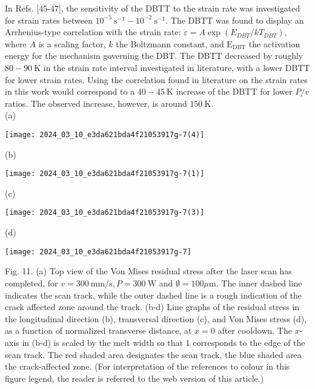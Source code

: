 \documentclass[10pt]{article}
\begin{document}
In Refs. [45-47], the sensitivity of the DBTT to the strain rate was investigated for strain rates between $10^{-5} \mathrm{~s}^{-1}-10^{-2} \mathrm{~s}^{-1}$. The DBTT was found to display an Arrhenius-type correlation with the strain rate: $\dot{\varepsilon}=A \exp \left(E_{D B T} / k T_{D B T}\right)$, where $A$ is a scaling factor, $k$ the Boltzmann constant, and $\mathrm{E}_{\mathrm{DBT}}$ the activation energy for the mechanism governing the DBT. The DBTT decreased by roughly $80-90 \mathrm{~K}$ in the strain rate interval investigated in literature, with a lower DBTT for lower strain rates. Using the correlation found in literature on the strain rates in this work would correspond to a $40-45 \mathrm{~K}$ increase of the DBTT for lower $P / v$ ratios. The observed increase, however, is around $150 \mathrm{~K}$.\\
(a)

\begin{center}
\texttt{[image: 2024\_03\_10\_e3da621bda4f21053917g-7(4)]}
\end{center}

(b)

\begin{center}
\texttt{[image: 2024\_03\_10\_e3da621bda4f21053917g-7(1)]}
\end{center}

(c)

\begin{center}
\texttt{[image: 2024\_03\_10\_e3da621bda4f21053917g-7(3)]}
\end{center}

(d)

\begin{center}
\texttt{[image: 2024\_03\_10\_e3da621bda4f21053917g-7]}
\end{center}

Fig. 11. (a) Top view of the Von Mises residual stress after the laser scan has completed, for $v=300 \mathrm{~mm} / \mathrm{s}, P=300 \mathrm{~W}$ and $\emptyset=100 \mu \mathrm{m}$. The inner dashed line indicates the scan track, while the outer dashed line is a rough indication of the crack affected zone around the track. (b-d) Line graphs of the residual stress in the longitudinal direction (b), transversal direction (c), and Von Mises stress (d), as a function of normalized transverse distance, at $x=0$ after cooldown. The $x$-axis in (b-d) is scaled by the melt width so that 1 corresponds to the edge of the scan track. The red shaded area designates the scan track, the blue shaded area the crack-affected zone. (For interpretation of the references to colour in this figure legend, the reader is referred to the web version of this article.)
\end{document}
